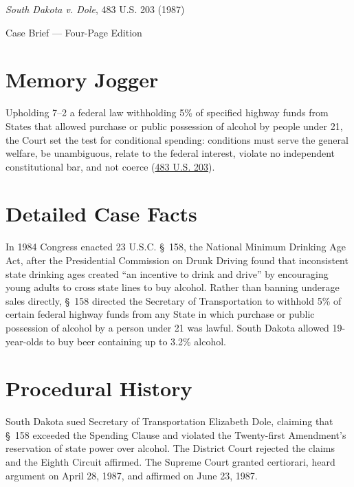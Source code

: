 \documentclass[12pt]{article}
\begin{document}
\begin{center}
{\LARGE \textit{South Dakota v. Dole}, 483 U.S. 203 (1987)\par}
\vspace{0.8em}
{\large Case Brief --- Four-Page Edition\par}
\end{center}
\vspace{1em}

\section{Memory Jogger}

Upholding 7--2 a federal law withholding 5\% of specified highway funds from States that allowed purchase or public possession of alcohol by people under 21, the Court set the test for conditional spending: conditions must serve the general welfare, be unambiguous, relate to the federal interest, violate no independent constitutional bar, and not coerce (\href{https://supreme.justia.com/cases/federal/us/483/203/}{483 U.S. 203}).

\section{Detailed Case Facts}

In 1984 Congress enacted 23 U.S.C. \S~158, the National Minimum Drinking Age Act, after the Presidential Commission on Drunk Driving found that inconsistent state drinking ages created ``an incentive to drink and drive'' by encouraging young adults to cross state lines to buy alcohol. Rather than banning underage sales directly, \S~158 directed the Secretary of Transportation to withhold 5\% of certain federal highway funds from any State in which purchase or public possession of alcohol by a person under 21 was lawful. South Dakota allowed 19-year-olds to buy beer containing up to 3.2\% alcohol.

\section{Procedural History}

South Dakota sued Secretary of Transportation Elizabeth Dole, claiming that \S~158 exceeded the Spending Clause and violated the Twenty-first Amendment's reservation of state power over alcohol. The District Court rejected the claims and the Eighth Circuit affirmed. The Supreme Court granted certiorari, heard argument on April 28, 1987, and affirmed on June 23, 1987.
\end{document}
